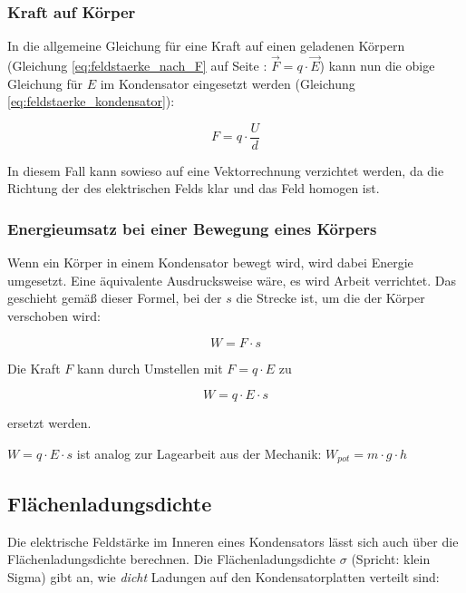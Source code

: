 \subsubsection{Kraft auf Körper}

In die allgemeine Gleichung für eine Kraft auf einen geladenen Körpern (Gleichung \ref{eq:feldstaerke_nach_F} auf Seite \pageref{eq:feldstaerke_nach_F}: $\vec{F} = q \cdot \vec{E}$) kann nun die obige Gleichung für $E$ im Kondensator eingesetzt werden (Gleichung \ref{eq:feldstaerke_kondensator}):

\begin{equation} \label{eq:kraft_kondensator}
	F = q \cdot \frac{U}{d}
\end{equation}

In diesem Fall kann sowieso auf eine Vektorrechnung verzichtet werden, da die Richtung der des elektrischen Felds klar und das Feld homogen ist.

\subsubsection{Energieumsatz bei einer Bewegung eines Körpers}

Wenn ein Körper in einem Kondensator bewegt wird, wird dabei Energie umgesetzt. Eine äquivalente Ausdrucksweise wäre, es wird \glqq Arbeit verrichtet\grqq . Das geschieht gemäß dieser Formel, bei der $s$ die Strecke ist, um die der Körper verschoben wird:

\begin{equation} \label{eq:arbeit}
	W = F \cdot s
\end{equation}

\noindent Die Kraft $F$ kann durch Umstellen mit $F = q \cdot E$ zu

\begin{equation} \label{eq:arbeit_kondensator}
	W = q \cdot E \cdot s
\end{equation}

\noindent ersetzt werden.

\begin{NiceToKnow}
$W = q \cdot E \cdot s$ ist analog zur Lagearbeit aus der Mechanik: $W_{pot} = m \cdot g \cdot h$
\end{NiceToKnow}


\subsection{Flächenladungsdichte}

Die elektrische Feldstärke im Inneren eines Kondensators lässt sich auch über die Flächenladungsdichte berechnen. Die Flächenladungsdichte $\sigma$ (Spricht: \glqq klein Sigma\grqq ) gibt an, wie \emph{dicht} Ladungen auf den Kondensatorplatten verteilt sind:

